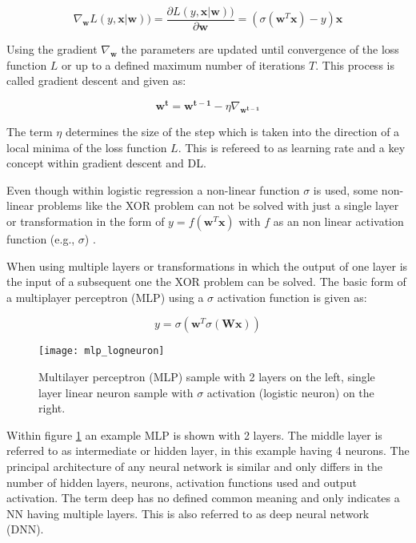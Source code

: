 \documentclass[../main.tex]{subfiles}
\begin{document}
\begin{equation}
    \nabla_{\mathbf{w}} L(y, \mathbf{x} | \mathbf{w})) = \frac{\partial L(y, \mathbf{x} | \mathbf{w}))}{\partial \mathbf{w}} = (\sigma(\mathbf{w}^T\mathbf{x}) - y)\mathbf{x}
\end{equation}

Using the gradient $\nabla_{\mathbf{w}}$ the parameters are updated until convergence of the loss function $L$ or up to a defined maximum number of iterations $T$. This process is called gradient descent and given as:

\begin{equation}
    \mathbf{w^{t}} = \mathbf{w^{t-1}} - \eta\nabla_{\mathbf{w^{t-1}}}
\end{equation}

The term $\eta$ determines the size of the step which is taken into the direction of a local minima of the loss function $L$. This is refereed to as learning rate and a key concept within gradient descent and DL.
\newline

 \label{par:mlp}

Even though within logistic regression a non-linear function $\sigma$ is used, some non-linear problems like the XOR problem can not be solved with just a single layer or transformation in the form of $y=f(\mathbf{w}^T\mathbf{x})$ with $f$ as an non linear activation function (e.g., $\sigma$) \cite{minsky_perceptrons_1969}.

When using multiple layers or transformations in which the output of one layer is the input of a subsequent one the XOR problem can be solved. The basic form of a multiplayer perceptron (MLP) using a $\sigma$ activation function is given as:

\begin{equation} \label{eq:mlp}
    y=\sigma(\mathbf{w}^T \sigma(\mathbf{W}\mathbf{x}))
\end{equation}

\begin{figure}[H]
    \centering
    \texttt{[image: mlp\_logneuron]}    
    \caption{Multilayer perceptron (MLP) sample with 2 layers on the left, single layer linear neuron sample with $\sigma$ activation (logistic neuron) on the right.}
    \label{fig:mlp_logneuron}
\end{figure}

Within figure \ref{fig:mlp_logneuron} an example MLP is shown with 2 layers. The middle layer is referred to as intermediate or hidden layer, in this example having 4 neurons. The principal architecture of any neural network is similar and only differs in the number of hidden layers, neurons, activation functions used and output activation. The term deep has no defined common meaning and only indicates a NN having multiple layers. This is also referred to as deep neural network (DNN). 
\newline
\end{document}

